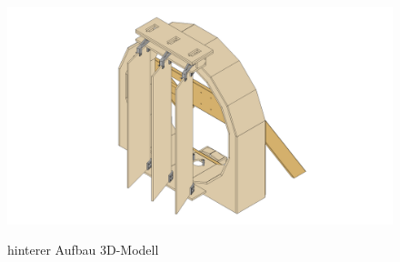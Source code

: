 \begin{figure}[H]
    \includegraphics[width=1.1\textwidth]{../Inventor/hintererAufbau/png/hintererAufbau_hauptansicht.png}
    \label{fig:aufbau:haupt}
    \caption{hinterer Aufbau 3D-Modell}
\end{figure}

